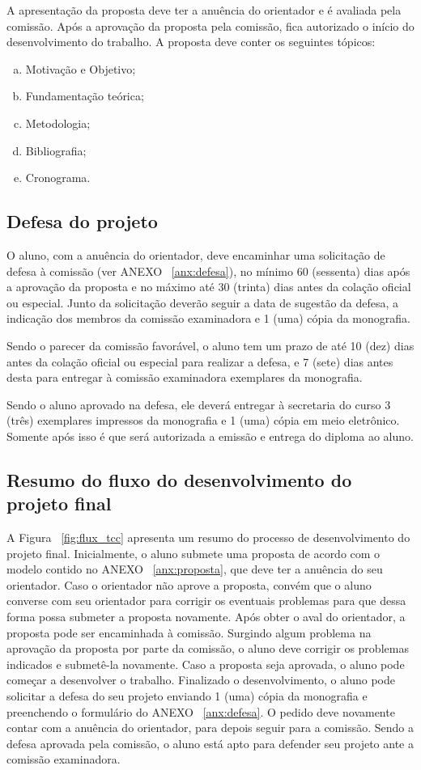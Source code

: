 A apresentação da proposta deve ter a anuência do orientador e é avaliada pela comissão. Após a 
aprovação da proposta pela comissão, fica autorizado o início do desenvolvimento do trabalho.
A proposta deve conter os seguintes tópicos:

\begin{enumerate}[a.]
\item Motivação e Objetivo;
\item Fundamentação teórica;
\item Metodologia;
\item Bibliografia;
\item Cronograma.
\end{enumerate}

\subsection{Defesa do projeto}
O aluno, com a anuência do orientador, deve encaminhar uma solicitação de defesa
à comissão (ver ANEXO ~\ref{anx:defesa}), no mínimo 60 (sessenta) dias após a aprovação da proposta e no máximo 
até 30 (trinta) dias antes da colação oficial ou especial.
Junto da solicitação deverão seguir a data de sugestão da defesa, a indicação
dos membros da comissão examinadora e 1 (uma) cópia da monografia.

Sendo o parecer da comissão favorável, o aluno tem um prazo de até 10 (dez)
dias antes da colação oficial ou especial para realizar a defesa, e 7 (sete) dias
antes desta para entregar à comissão examinadora exemplares da monografia.

Sendo o aluno aprovado na defesa, ele deverá entregar à secretaria do curso 3 (três)
exemplares impressos da monografia e 1 (uma) cópia em meio eletrônico. Somente após 
isso é que será autorizada a emissão e entrega do diploma ao aluno.

\subsection{Resumo do fluxo do desenvolvimento do projeto final}
A Figura ~\ref{fig:flux_tcc} apresenta um resumo do processo de desenvolvimento do projeto final. 
Inicialmente, o aluno submete uma proposta de acordo com o modelo contido no ANEXO ~\ref{anx:proposta}, 
que deve ter a anuência do seu orientador. Caso o orientador não aprove a proposta, convém que
o aluno converse com seu orientador para corrigir os eventuais problemas para que dessa forma possa
submeter a proposta novamente. Após obter o aval do orientador, a proposta pode ser encaminhada
à comissão. Surgindo algum problema na aprovação da proposta por parte da comissão, o aluno
deve corrigir os problemas indicados e submetê-la novamente. Caso a proposta seja aprovada, o aluno
pode começar a desenvolver o trabalho. Finalizado o desenvolvimento, o aluno pode solicitar 
a defesa do seu projeto enviando 1 (uma) cópia da monografia e preenchendo o formulário do
ANEXO ~\ref{anx:defesa}. O pedido deve novamente contar com a anuência do orientador, para depois
seguir para a comissão. Sendo a defesa aprovada pela comissão, o aluno está apto para defender
seu projeto ante a comissão examinadora.


